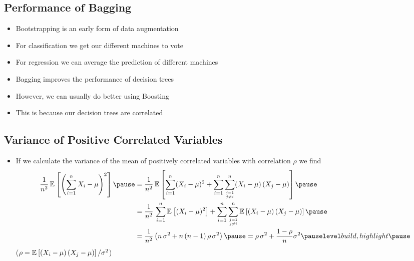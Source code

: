 
\begin{slide}
\section{Performance of Bagging}

\begin{PauseHighLight}
  \begin{itemize}
  \item Bootstrapping is an early form of data augmentation\pause
  \item For classification we get our different machines to vote\pause
  \item For regression we can average the prediction of different
    machines\pause
  \item Bagging improves the performance of decision trees\pause
  \item However, we can usually do better using Boosting\pause
  \item This is because our decision trees are correlated\pause
  \end{itemize}
\end{PauseHighLight}

\end{slide}



\begin{slide}
\section{Variance of Positive Correlated Variables}

\begin{PauseHighLight}\small
  \begin{itemize}
  \item If we calculate the variance of the mean of positively correlated
    variables with correlation $\rho$ we find
    \begin{align*}
      \frac{1}{n^2} \, \av{ \left(\sum_{i=1}^n X_i -\mu\right)^2}\pause
       &=\frac{1}{n^2} \, \av{ \sum_{i=1}^n (X_i -\mu)^2
        + \sum_{i=1}^n\sum_{j=1\atop j\neq i}^n
         (X_i-\mu)\,(X_j-\mu)}\pause\\
       &=\frac{1}{n^2} \,\sum_{i=1}^n  \av{ (X_i -\mu)^2}
        + \sum_{i=1}^n\sum_{j=1\atop j\neq i}^n
          \av{ (X_i-\mu)\,(X_j-\mu)}\pause\\
      &= \frac{1}{n^2} \left( n\, \sigma^2 + n\,(n-1)\, \rho\,
        \sigma^2 \right)\pause 
      = \rho\,\sigma^2 + \frac{1-\rho}{n} \sigma^2\pauseb
    \end{align*}
  ($\rho = \mathbb{E}_{}\left[ (X_i-\mu)\,(X_j-\mu) \right]/\sigma^2$)\pause
  \end{itemize}
\end{PauseHighLight}
\end{slide}

